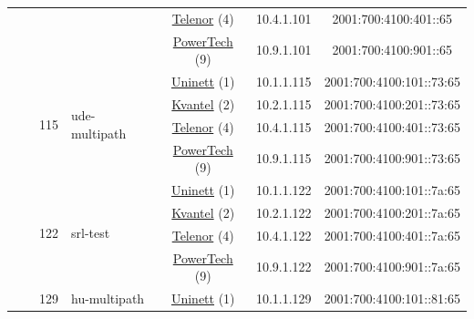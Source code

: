 \begin{small}
\begin{center}
\begin{longtable}{|c|c|c|c|c|c|c|c|}
  &  & \multicolumn{2}{|c|}{} & \multicolumn{2}{|c|}{\tiny{\href{https://www.telenor.no}{Telenor} (4)}} & \tiny{10.4.1.101} & \tiny{2001:700:4100:401::65} \\* \cline{5-5}\cline{6-6}\cline{7-7}\cline{8-8}
  &  & \multicolumn{2}{|c|}{} & \multicolumn{2}{|c|}{\tiny{\href{http://www.powertech.no}{PowerTech} (9)}} & \tiny{10.9.1.101} & \tiny{2001:700:4100:901::65} \\* \cline{3-3}\cline{4-4}\cline{5-5}\cline{6-6}\cline{7-7}\cline{8-8}
  &  & \multirow{4}{*}{\tiny{115}} & \multicolumn{1}{|l|}{\multirow{4}{*}{\tiny{ude-multipath}}} & \multicolumn{2}{|c|}{\tiny{\href{https://www.uninett.no}{Uninett} (1)}} & \tiny{10.1.1.115} & \tiny{2001:700:4100:101::73:65} \\* \cline{5-5}\cline{6-6}\cline{7-7}\cline{8-8}
  &  &  &  & \multicolumn{2}{|c|}{\tiny{\href{http://kvantel.no}{Kvantel} (2)}} & \tiny{10.2.1.115} & \tiny{2001:700:4100:201::73:65} \\* \cline{5-5}\cline{6-6}\cline{7-7}\cline{8-8}
  &  &  &  & \multicolumn{2}{|c|}{\tiny{\href{https://www.telenor.no}{Telenor} (4)}} & \tiny{10.4.1.115} & \tiny{2001:700:4100:401::73:65} \\* \cline{5-5}\cline{6-6}\cline{7-7}\cline{8-8}
  &  &  &  & \multicolumn{2}{|c|}{\tiny{\href{http://www.powertech.no}{PowerTech} (9)}} & \tiny{10.9.1.115} & \tiny{2001:700:4100:901::73:65} \\* \cline{3-3}\cline{4-4}\cline{5-5}\cline{6-6}\cline{7-7}\cline{8-8}
  &  & \multirow{4}{*}{\tiny{122}} & \multicolumn{1}{|l|}{\multirow{4}{*}{\tiny{srl-test}}} & \multicolumn{2}{|c|}{\tiny{\href{https://www.uninett.no}{Uninett} (1)}} & \tiny{10.1.1.122} & \tiny{2001:700:4100:101::7a:65} \\* \cline{5-5}\cline{6-6}\cline{7-7}\cline{8-8}
  &  &  &  & \multicolumn{2}{|c|}{\tiny{\href{http://kvantel.no}{Kvantel} (2)}} & \tiny{10.2.1.122} & \tiny{2001:700:4100:201::7a:65} \\* \cline{5-5}\cline{6-6}\cline{7-7}\cline{8-8}
  &  &  &  & \multicolumn{2}{|c|}{\tiny{\href{https://www.telenor.no}{Telenor} (4)}} & \tiny{10.4.1.122} & \tiny{2001:700:4100:401::7a:65} \\* \cline{5-5}\cline{6-6}\cline{7-7}\cline{8-8}
  &  &  &  & \multicolumn{2}{|c|}{\tiny{\href{http://www.powertech.no}{PowerTech} (9)}} & \tiny{10.9.1.122} & \tiny{2001:700:4100:901::7a:65} \\* \cline{3-3}\cline{4-4}\cline{5-5}\cline{6-6}\cline{7-7}\cline{8-8}
  &  & \multirow{4}{*}{\tiny{129}} & \multicolumn{1}{|l|}{\multirow{4}{*}{\tiny{hu-multipath}}} & \multicolumn{2}{|c|}{\tiny{\href{https://www.uninett.no}{Uninett} (1)}} & \tiny{10.1.1.129} & \tiny{2001:700:4100:101::81:65} \\* \cline{5-5}\cline{6-6}\cline{7-7}\cline{8-8}

\end{longtable}
\end{center}
\end{small}
